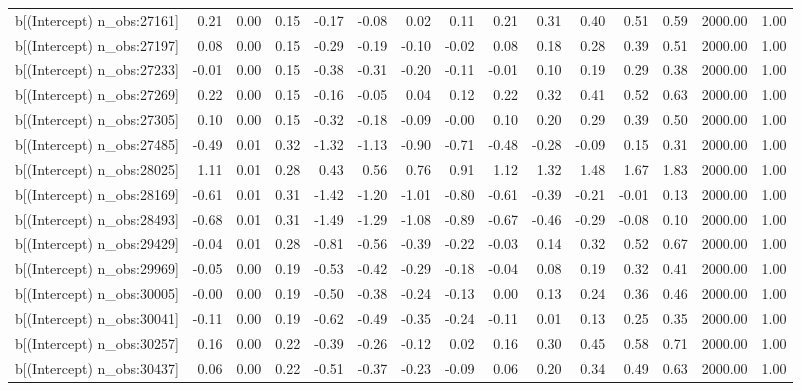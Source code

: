 \begin{table}[ht]
\begin{tabular}{rrrrrrrrrrrrrrr}
  b[(Intercept) n\_obs:27161] & 0.21 & 0.00 & 0.15 & -0.17 & -0.08 & 0.02 & 0.11 & 0.21 & 0.31 & 0.40 & 0.51 & 0.59 & 2000.00 & 1.00 \\ 
  b[(Intercept) n\_obs:27197] & 0.08 & 0.00 & 0.15 & -0.29 & -0.19 & -0.10 & -0.02 & 0.08 & 0.18 & 0.28 & 0.39 & 0.51 & 2000.00 & 1.00 \\ 
  b[(Intercept) n\_obs:27233] & -0.01 & 0.00 & 0.15 & -0.38 & -0.31 & -0.20 & -0.11 & -0.01 & 0.10 & 0.19 & 0.29 & 0.38 & 2000.00 & 1.00 \\ 
  b[(Intercept) n\_obs:27269] & 0.22 & 0.00 & 0.15 & -0.16 & -0.05 & 0.04 & 0.12 & 0.22 & 0.32 & 0.41 & 0.52 & 0.63 & 2000.00 & 1.00 \\ 
  b[(Intercept) n\_obs:27305] & 0.10 & 0.00 & 0.15 & -0.32 & -0.18 & -0.09 & -0.00 & 0.10 & 0.20 & 0.29 & 0.39 & 0.50 & 2000.00 & 1.00 \\ 
  b[(Intercept) n\_obs:27485] & -0.49 & 0.01 & 0.32 & -1.32 & -1.13 & -0.90 & -0.71 & -0.48 & -0.28 & -0.09 & 0.15 & 0.31 & 2000.00 & 1.00 \\ 
  b[(Intercept) n\_obs:28025] & 1.11 & 0.01 & 0.28 & 0.43 & 0.56 & 0.76 & 0.91 & 1.12 & 1.32 & 1.48 & 1.67 & 1.83 & 2000.00 & 1.00 \\ 
  b[(Intercept) n\_obs:28169] & -0.61 & 0.01 & 0.31 & -1.42 & -1.20 & -1.01 & -0.80 & -0.61 & -0.39 & -0.21 & -0.01 & 0.13 & 2000.00 & 1.00 \\ 
  b[(Intercept) n\_obs:28493] & -0.68 & 0.01 & 0.31 & -1.49 & -1.29 & -1.08 & -0.89 & -0.67 & -0.46 & -0.29 & -0.08 & 0.10 & 2000.00 & 1.00 \\ 
  b[(Intercept) n\_obs:29429] & -0.04 & 0.01 & 0.28 & -0.81 & -0.56 & -0.39 & -0.22 & -0.03 & 0.14 & 0.32 & 0.52 & 0.67 & 2000.00 & 1.00 \\ 
  b[(Intercept) n\_obs:29969] & -0.05 & 0.00 & 0.19 & -0.53 & -0.42 & -0.29 & -0.18 & -0.04 & 0.08 & 0.19 & 0.32 & 0.41 & 2000.00 & 1.00 \\ 
  b[(Intercept) n\_obs:30005] & -0.00 & 0.00 & 0.19 & -0.50 & -0.38 & -0.24 & -0.13 & 0.00 & 0.13 & 0.24 & 0.36 & 0.46 & 2000.00 & 1.00 \\ 
  b[(Intercept) n\_obs:30041] & -0.11 & 0.00 & 0.19 & -0.62 & -0.49 & -0.35 & -0.24 & -0.11 & 0.01 & 0.13 & 0.25 & 0.35 & 2000.00 & 1.00 \\ 
  b[(Intercept) n\_obs:30257] & 0.16 & 0.00 & 0.22 & -0.39 & -0.26 & -0.12 & 0.02 & 0.16 & 0.30 & 0.45 & 0.58 & 0.71 & 2000.00 & 1.00 \\ 
  b[(Intercept) n\_obs:30437] & 0.06 & 0.00 & 0.22 & -0.51 & -0.37 & -0.23 & -0.09 & 0.06 & 0.20 & 0.34 & 0.49 & 0.63 & 2000.00 & 1.00 \\ 

\end{tabular}
\end{table}

